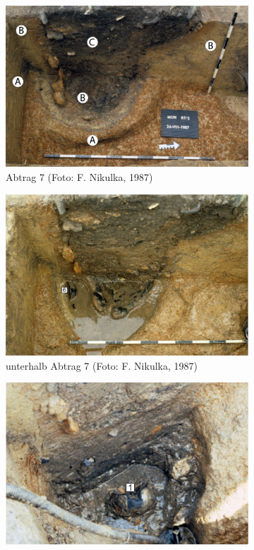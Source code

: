 \begin{figure}[p]
\begin{subfigure}{\columnwidth}
		\includegraphics[width = \textwidth]{fig/MUN87-211-7_F87-03-26.pdf}
		\caption{Abtrag 7 (Foto: F. Nikulka, 1987)}
		\label{fig:MUN87-211-7.1}
	\end{subfigure}
	\begin{subfigure}{\columnwidth}
		\centering
		\includegraphics[width = \textwidth]{fig/MUN87-211-7_F87-03-36.pdf}
		\caption{unterhalb Abtrag 7 (Foto: F. Nikulka, 1987)}
		\label{fig:MUN87-211-7.2}
	\end{subfigure}\hfill
	\begin{subfigure}{\columnwidth}
		\centering
		\includegraphics[width = \textwidth]{fig/MUN87-211-8_E87-046-2.pdf}

\end{subfigure}
\end{figure}
